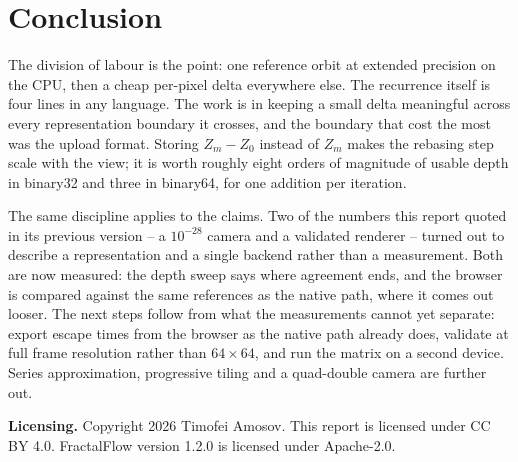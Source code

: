 \documentclass[10pt,a4paper]{article}
\begin{document}
\section{Conclusion}

The division of labour is the point: one reference orbit at extended precision
on the CPU, then a cheap per-pixel delta everywhere else. The recurrence itself
is four lines in any language. The work is in keeping a small delta meaningful
across every representation boundary it crosses, and the boundary that cost the
most was the upload format. Storing \(Z_m-Z_0\) instead of \(Z_m\) makes the
rebasing step scale with the view; it is worth roughly eight orders of
magnitude of usable depth in binary32 and three in binary64, for one addition
per iteration.

The same discipline applies to the claims. Two of the numbers this report
quoted in its previous version -- a \(10^{-28}\) camera and a validated
renderer -- turned out to describe a representation and a single backend
rather than a measurement. Both are now measured: the depth sweep says where
agreement ends, and the browser is compared against the same references as the
native path, where it comes out looser. The next steps follow from what the
measurements cannot yet separate: export escape times from the browser as the
native path already does, validate at full frame resolution rather than
\(64\times64\), and run the matrix on a second device. Series approximation, progressive tiling and a
quad-double camera are further out.

\thispagestyle{fancy}
\begingroup
\scriptsize


\endgroup

\medskip
\noindent\footnotesize
\textbf{Licensing.} Copyright 2026 Timofei Amosov. This report is licensed
under CC BY 4.0. FractalFlow version 1.2.0 is licensed under Apache-2.0.
\end{document}
